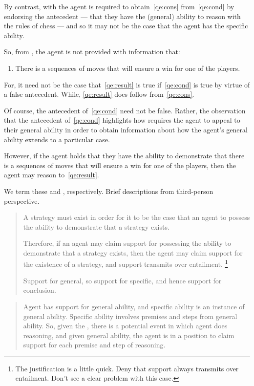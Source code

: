 \begin{note}
  By contrast, with \GSI{} the agent is required to obtain~\ref{qe:cons} from~\ref{qe:cond} by endorsing the antecedent --- that they have the (general) ability to reason with the rules of chess --- and so it may not be the case that the agent has the specific ability.

  So, from \GSI{}, the agent is not provided with information that:
  \begin{enumerate}[label=(I\arabic*), ref=(I\arabic*), resume]
  \item\label{qe:result} There is a sequences of moves that will ensure a win for one of the players.
  \end{enumerate}
  For, it need not be the case that~\ref{qe:result} is true if~\ref{qe:cond} is true by virtue of a false antecedent.
  While, \ref{qe:result} does follow from~\ref{qe:cons}.

  Of course, the antecedent of~\ref{qe:cond} need not be false.
  Rather, the observation that the antecedent of~\ref{qe:cond} highlights how \GSI{} requires the agent to appeal to their general ability in order to obtain information about how the agent's general ability extends to a particular case.

  However, if the agent holds that they have the ability to demonstrate that there is a sequences of moves that will ensure a win for one of the players, then the agent may reason to~\ref{qe:result}.

  We term these \AR{} and \WR{}, respectively.
  Brief descriptions from third-person perspective.

  \begin{description}[left=\parindent]
  \item[\(\cdot\)\hspace{1em}\AR{}]\label{A:s}\mbox{}
    \begin{quote}
    A strategy must exist in order for it to be the case that an agent to possess the ability to demonstrate that a strategy exists.

    Therefore, if an agent may claim support for possessing the ability to demonstrate that a strategy exists, then the agent may claim support for the existence of a strategy, and support transmits over entailment.\nolinebreak
    \footnote{
      The justification is a little quick.
      Deny that support always transmits over entailment.
      Don't see a clear problem with this case.
    }

    Support for general, so support for specific, and hence support for conclusion.
  \end{quote}
\item[\(\cdot\)\hspace{1em}\WR{}]\label{W:s}\mbox{}
    \begin{quote} Agent has support for general ability, and specific ability is an instance of general ability.
    Specific ability involves premises and steps from general ability.
    So, given the \GSI{}, there is a potential event in which agent does reasoning, and given general ability, the agent is in a position to claim support for each premise and step of reasoning.
  \end{quote}
\end{description}


\end{note}
